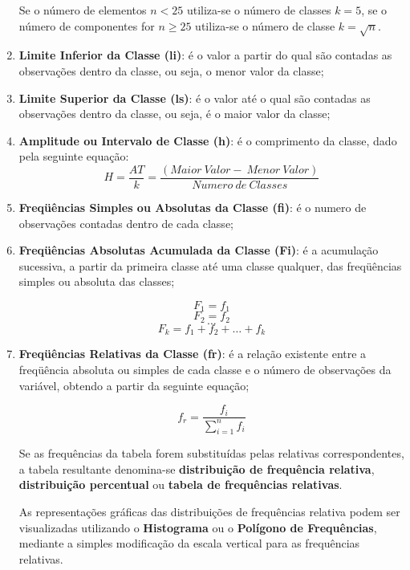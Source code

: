\begin{enumerate}
Se o número de elementos $n < 25$  utiliza-se o número de classes $k= 5$, se o número de componentes for
$n \geq 25$  utiliza-se o número de classe $k=\sqrt{n}$.
  \item \textbf{Limite Inferior da Classe (li)}: é o valor a partir do qual são contadas as observações dentro da classe, ou seja, o menor valor da classe;
  \item \textbf{Limite Superior da Classe (ls)}: é o valor até o qual são contadas as observações dentro da classe, ou seja, é o maior valor da classe;
  \item \textbf{Amplitude ou Intervalo de Classe (h)}: é o comprimento da classe, dado pela seguinte equação:
      \begin{equation}\label{}
        H=\frac{AT}{k}=\frac{(Maior \ Valor - \ Menor \ Valor)}{Numero \ de \ Classes}
      \end{equation}
  \item \textbf{Freqüências Simples ou Absolutas da Classe (fi)}: é o numero de observações contadas dentro de cada classe;
  \item \textbf{Freqüências Absolutas Acumulada da Classe (Fi)}: é a acumulação sucessiva, a partir da primeira classe até uma classe qualquer, das freqüências simples ou absoluta das classes;


      $$ F_{1}= f_{1} $$
      $$ F_{2}= f_{2} $$
      $$ \ldots  $$
      $$ F_{k}= f_{1}+f_{2}+\ldots+ f_{k}$$


  \item \textbf{Freqüências Relativas da Classe (fr)}: é a relação existente entre a freqüência absoluta ou simples de cada classe e o número de observações da variável, obtendo a partir da seguinte equação;

      \begin{equation}\label{}
        f_{r}=\frac{f_{i}}{\sum_{i=1}^{n}f_{i}}
      \end{equation}

Se as frequências da tabela forem substituídas pelas relativas correspondentes, a tabela resultante denomina-se \textbf{distribuição de frequência relativa}, \textbf{distribuição percentual} ou \textbf{tabela de frequências relativas}.\vskip0.3cm

As representações gráficas das distribuições de frequências relativa podem ser visualizadas utilizando o \textbf{Histograma} ou o \textbf{Polígono de Frequências}, mediante a simples modificação da escala vertical para as frequências relativas.




\end{enumerate}
